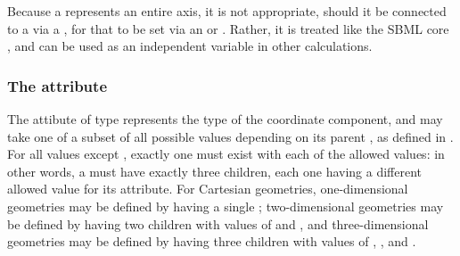 Because a \CoordinateComponent represents an entire axis, it is not appropriate, should it be connected to a \Parameter via a \SpatialSymbolReference, for that \Parameter to be set via an \InitialAssignment or \Rule.  Rather, it is treated like the SBML core  , and can be used as an independent variable in other calculations.

\subsubsection{The  attribute}
The  attibute of type  represents the type of the coordinate component, and may take one of a subset of all possible  values depending on its parent \Geometry, as defined in .  For all  values except , exactly one \CoordinateComponent must exist with each of the allowed  values:  in other words, a  \Geometry must have exactly three \CoordinateComponent children, each one having a different allowed value for its  attribute.  For Cartesian geometries, one-dimensional geometries may be defined by having a single  \CoordinateComponent; two-dimensional geometries may be defined by having two \CoordinateComponent children with  values of  and , and three-dimensional geometries may be defined by having three \CoordinateComponent children with  values of , , and .


